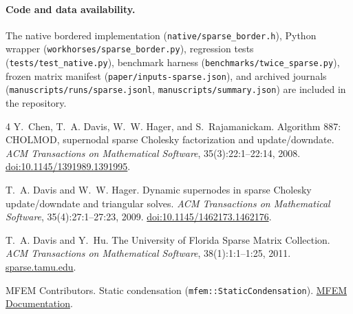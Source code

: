 \documentclass[10pt,letterpaper]{article}
\begin{document}
\paragraph{Code and data availability.}
The native bordered implementation (\nolinkurl{native/sparse_border.h}), Python wrapper (\nolinkurl{workhorses/sparse_border.py}), regression tests (\nolinkurl{tests/test_native.py}), benchmark harness (\nolinkurl{benchmarks/twice_sparse.py}), frozen matrix manifest (\nolinkurl{paper/inputs-sparse.json}), and archived journals (\nolinkurl{manuscripts/runs/sparse.jsonl}, \nolinkurl{manuscripts/summary.json}) are included in the repository.

\begin{thebibliography}{4}
Y.~Chen, T.~A. Davis, W.~W. Hager, and S.~Rajamanickam.
\newblock Algorithm 887: CHOLMOD, supernodal sparse Cholesky factorization and update/downdate.
\newblock \emph{ACM Transactions on Mathematical Software}, 35(3):22:1--22:14, 2008.
\newblock \href{https://doi.org/10.1145/1391989.1391995}{doi:10.1145/1391989.1391995}.

T.~A. Davis and W.~W. Hager.
\newblock Dynamic supernodes in sparse Cholesky update/downdate and triangular solves.
\newblock \emph{ACM Transactions on Mathematical Software}, 35(4):27:1--27:23, 2009.
\newblock \href{https://doi.org/10.1145/1462173.1462176}{doi:10.1145/1462173.1462176}.

T.~A. Davis and Y.~Hu.
\newblock The University of Florida Sparse Matrix Collection.
\newblock \emph{ACM Transactions on Mathematical Software}, 38(1):1:1--1:25, 2011.
\newblock \href{https://sparse.tamu.edu/}{sparse.tamu.edu}.

MFEM Contributors.
\newblock Static condensation (\texttt{mfem::StaticCondensation}).
\newblock \href{https://docs.mfem.org/html/classmfem_1_1StaticCondensation.html}{MFEM Documentation}.
\end{thebibliography}
\end{document}
